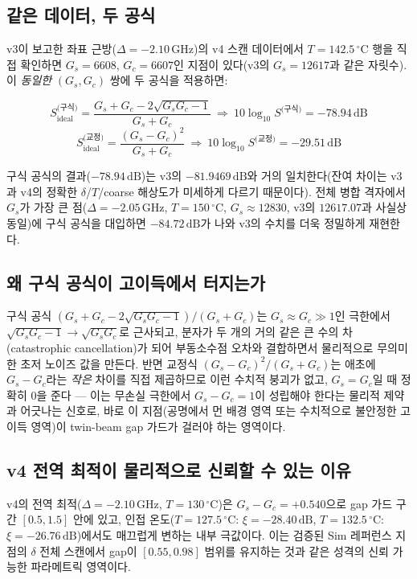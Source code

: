 \documentclass[11pt,a4paper]{article}
\newcommand{\dB}{\,\mathrm{dB}}
\newcommand{\GHz}{\,\mathrm{GHz}}
\newcommand{\degC}{\,^{\circ}\mathrm{C}}
\begin{document}
\subsection{같은 데이터, 두 공식}
v3이 보고한 좌표 근방($\Delta=-2.10\GHz$)의 v4 스캔 데이터에서 $T=142.5\degC$
행을 직접 확인하면 $G_s=6608$, $G_c=6607$인 지점이 있다(v3의 $G_s=12617$과
같은 자릿수). 이 \emph{동일한} $(G_s,G_c)$ 쌍에 두 공식을 적용하면:

\begin{equation}
S_{\mathrm{ideal}}^{\text{(구식)}}=\frac{G_s+G_c-2\sqrt{G_sG_c-1}}{G_s+G_c}
\ \Longrightarrow\ 10\log_{10}S^{\text{(구식)}}=-78.94\dB
\end{equation}
\begin{equation}
S_{\mathrm{ideal}}^{\text{(교정)}}=\frac{(G_s-G_c)^2}{G_s+G_c}
\ \Longrightarrow\ 10\log_{10}S^{\text{(교정)}}=-29.51\dB
\end{equation}

구식 공식의 결과($-78.94\dB$)는 v3의 $-81.9469\dB$와 거의 일치한다(잔여
차이는 v3과 v4의 정확한 $\delta$/$T$/coarse 해상도가 미세하게 다르기
때문이다). 전체 병합 격자에서 $G_s$가 가장 큰 점($\Delta=-2.05\GHz$,
$T=150\degC$, $G_s\approx12830$, v3의 $12617.07$과 사실상 동일)에 구식
공식을 대입하면 $-84.72\dB$가 나와 v3의 수치를 더욱 정밀하게 재현한다.

\subsection{왜 구식 공식이 고이득에서 터지는가}
구식 공식 $(G_s+G_c-2\sqrt{G_sG_c-1})/(G_s+G_c)$는 $G_s\approx G_c\gg1$인
극한에서 $\sqrt{G_sG_c-1}\to\sqrt{G_sG_c}$로 근사되고, 분자가 두 개의 거의
같은 큰 수의 차(catastrophic cancellation)가 되어 부동소수점 오차와
결합하면서 물리적으로 무의미한 초저 노이즈 값을 만든다. 반면 교정식
$(G_s-G_c)^2/(G_s+G_c)$는 애초에 $G_s-G_c$라는 \emph{작은} 차이를 직접
제곱하므로 이런 수치적 붕괴가 없고, $G_s=G_c$일 때 정확히 $0$을 준다 — 이는
무손실 극한에서 $G_s-G_c=1$이 성립해야 한다는 물리적 제약과 어긋나는 신호로,
바로 이 지점(공명에서 먼 배경 영역 또는 수치적으로 불안정한 고이득 영역)이
twin-beam gap 가드가 걸러야 하는 영역이다.

\subsection{v4 전역 최적이 물리적으로 신뢰할 수 있는 이유}
v4의 전역 최적($\Delta=-2.10\GHz$, $T=130\degC$)은 $G_s-G_c=+0.540$으로
gap 가드 구간 $[0.5,1.5]$ 안에 있고, 인접 온도($T=127.5\degC$: $\xi=-28.40\dB$,
$T=132.5\degC$: $\xi=-26.76\dB$)에서도 매끄럽게 변하는 내부 극값이다. 이는
검증된 Sim 레퍼런스 지점의 $\delta$ 전체 스캔에서 gap이 $[0.55,0.98]$
범위를 유지하는 것과 같은 성격의 신뢰 가능한 파라메트릭 영역이다.
\end{document}
